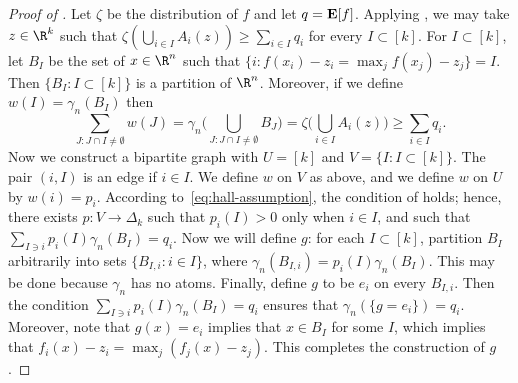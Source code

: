 \documentclass{toc}
\newcommand{\E}{{\bf E}}
\begin{document}
\begin{proof}[Proof of ]
    Let $\zeta$ be the distribution of $f$ and let $q = \E[f]$. Applying ,
  we may take $z \in \R^k$ such that
  $\zeta(\bigcup_{i \in I} A_i(z)) \ge \sum_{i \in I} q_i$ for every $I \subset [k]$. For
  $I \subset [k]$, let $B_I$ be the set of $x \in \R^n$ such that $\{i: f(x_i) - z_i = \max_j f(x_j) - z_j\} = I$. Then $\{B_I: I \subset [k]\}$ is a
  partition of $\R^n$. Moreover, if we define $w(I) = \gamma_n(B_I)$ then
  \begin{equation}\label{eq:hall-assumption}
    \sum_{J: J \cap I \ne \emptyset} w(J) = \gamma_n\Big(\bigcup_{J: J \cap I \ne \emptyset} B_J\Big) = \zeta\Big(\bigcup_{i \in I} A_i(z)\Big) \ge \sum_{i \in I} q_i.
  \end{equation}
  Now we construct a bipartite graph with $U = [k]$ and $V = \{I: I \subset [k]\}$. The pair $(i, I)$
  is an edge if $i \in I$. We define $w$ on $V$ as above, and we define $w$ on $U$ by $w(i) = p_i$.
  According to~\eqref{eq:hall-assumption}, the condition of 
  holds; hence, there exists $p: V \to \Delta_k$ such that $p_i(I) > 0$ only when $i \in I$, and
  such that $\sum_{I \ni i} p_i(I) \gamma_n(B_I) = q_i$. Now we will define $g$: for each 
  $I \subset [k]$, partition $B_I$ arbitrarily into sets $\{B_{I,i}: i \in I\}$, where
  $\gamma_n(B_{I,i}) = p_i(I) \gamma_n(B_I)$. This may be done because $\gamma_n$ has no atoms.
  Finally, define $g$ to be $e_i$ on every $B_{I,i}$.
  Then the condition $\sum_{I \ni i} p_i(I) \gamma_n(B_I) = q_i$ ensures that $\gamma_n(\{g = e_i\}) = q_i$.
  Moreover, note that $g(x) = e_i$ implies that $x \in B_I$ for some $I$, which implies
  that $f_i(x) - z_i = \max_j (f_j(x) - z_j)$. This completes the construction of $g$.
\end{proof}
\end{document}
